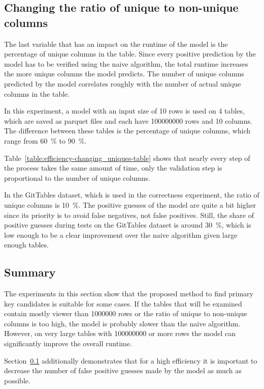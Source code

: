


\subsection{Changing the ratio of unique to non-unique columns}\label{subsec:efficiency-changing_uniques}
The last variable that has an impact on the runtime of the model is the percentage of unique columns in the table. Since every positive prediction by the model has to be verified using the naive algorithm, the total runtime increases the more unique columns the model predicts. The number of unique columns predicted by the model correlates roughly with the number of actual unique columns in the table. %

In this experiment, a model with an input size of \num{10} rows is used on \num{4} tables, which are saved as parquet files and each have \num{100000000} rows and \num{10} columns. The difference between these tables is the percentage of unique columns, which range from \SI{60}{\percent} to \SI{90}{\percent}.

Table~\ref{table:efficiency-changing_uniques-table} shows that nearly every step of the process takes the same amount of time, only the validation step is proportional to the number of unique columns.

In the GitTables dataset, which is used in the correctness experiment, the ratio of unique columns is \SI{10}{\percent}. The positive guesses of the model are quite a bit higher since its priority is to avoid false negatives, not false positives. Still, the share of positive guesses during tests on the GitTables dataset is around \SI{30}{\percent}, which is low enough to be a clear improvement over the naive algorithm given large enough tables. %



\subsection{Summary}\label{subsec:efficiency-summary}
The experiments in this section show that the proposed method to find primary key candidates is suitable for some cases. If the tables that will be examined contain mostly viewer than \num{1000000} rows or the ratio of unique to non-unique columns is too high, the model is probably slower than the naive algorithm. However, on very large tables with \num{100000000} or more rows the model can significantly improve the overall runtime. %

Section~\ref{subsec:efficiency-changing_uniques} additionally demonstrates that for a high efficiency it is important to decrease the number of false positive guesses made by the model as much as possible.
